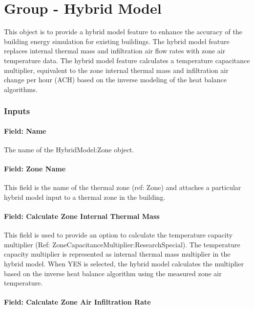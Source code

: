 \section{Group - Hybrid Model}\label{group---hybrid-model}

This object is to provide a hybrid model feature to enhance the accuracy of the building energy simulation for existing buildings. The hybrid model feature replaces internal thermal mass and infiltration air flow rates with zone air temperature data. The hybrid model feature calculates a temperature capacitance multiplier, equivalent to the zone internal thermal mass and infiltration air change per hour (ACH) based on the inverse modeling of the heat balance algorithms. 

\subsubsection{Inputs}\label{inputs-hm}

\paragraph{Field: Name}\label{field-name-hm}

The name of the HybridModel:Zone object.

\paragraph{Field: Zone Name}\label{field-zone-name-hm}

This field is the name of the thermal zone (ref: Zone) and attaches a particular hybrid model input to a thermal zone in the building.

\paragraph{Field: Calculate Zone Internal Thermal Mass}\label{field-calculate-zon-internal-thermal-mass-hm}

This field is used to provide an option to calculate the temperature capacity multiplier (Ref: ZoneCapacitanceMultiplier:ResearchSpecial). The temperature capacity multiplier is represented as internal thermal mass multiplier in the hybrid model. 
When YES is selected, the hybrid model calculates the multiplier based on the inverse heat balance algorithm using the measured zone air temperature.

\paragraph{Field: Calculate Zone Air Infiltration Rate}\label{field-calculate-zone-air-fnfiltration-rate-hm}

